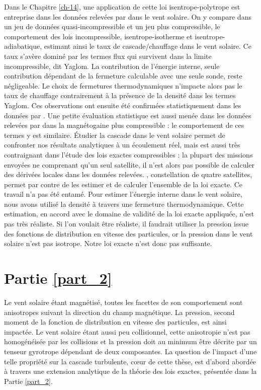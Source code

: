 Dans le Chapitre \ref{ch-14}, une application de cette loi isentrope-polytrope est entreprise dans les données relevées par  dans le vent solaire. On y compare dans un jeu de données quasi-incompressible et un jeu plus compressible, le comportement des lois incompressible, isentrope-isotherme et isentrope-adiabatique, estimant ainsi le taux de cascade/chauffage dans le vent solaire. Ce taux s'avère dominé par les termes flux qui survivent dans la limite incompressible, dit Yaglom. La contribution de l'énergie interne, seule contribution dépendant de la fermeture calculable avec une seule sonde, reste négligeable. Le choix de fermetures thermodynamiques n'impacte alors pas le taux de chauffage contrairement à la présence de la densité dans les termes Yaglom. Ces observations ont ensuite été confirmées statistiquement dans les données  par \cite{brodiano_statistical_2022}. Une petite évaluation statistique est aussi menée dans les données relevées par  dans la magnétogaine plus compressible : le comportement de ces termes y est similaire. Étudier la cascade dans le vent solaire permet de confronter nos résultats analytiques à un écoulement réel, mais est aussi très contraignant dans l'étude des lois exactes compressibles : la plupart des missions envoyées ne comprenant qu'un seul satellite, il n'est alors pas possible de calculer des dérivées locales dans les données relevées. , constellation de quatre satellites, permet par contre de les estimer et de calculer l'ensemble de la loi exacte. Ce travail n'a pas été entamé. Pour estimer l'énergie interne dans le vent solaire, nous avons utilisé la densité à travers une fermeture thermodynamique. Cette estimation, en accord avec le domaine de validité de la loi exacte appliquée, n'est pas très réaliste. Si l'on voulait être réaliste, il faudrait utiliser la pression issue des fonctions de distribution en vitesse des particules, or la pression dans le vent solaire n'est pas isotrope. Notre loi exacte n'est donc pas suffisante. 

\section{Partie \ref{part_2}}

Le vent solaire étant magnétisé, toutes les facettes de son comportement sont anisotropes suivant la direction du champ magnétique. La pression, second moment de la fonction de distribution en vitesse des particules, est ainsi impactée. Le vent solaire étant aussi peu collisionnel, cette anisotropie n'est pas homogénéisée par les collisions et la pression doit au minimum être décrite par un tenseur gyrotrope dépendant de deux composantes. La question de l'impact d'une telle propriété sur la cascade turbulente, cœur de cette thèse, est d'abord abordée à travers une extension analytique de la théorie des lois exactes, présentée dans la Partie \ref{part_2}. 

